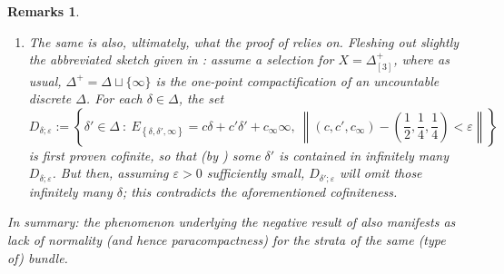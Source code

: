 \documentclass[11pt,leqno]{article}
\theoremstyle{plain}
\theoremstyle{plain}
\theoremstyle{plain}
\newtheorem{remarks}[lemma]{Remarks}
\numberwithin{equation}{section}
\theoremstyle{nonumberplain}
\newcommand\1{{\bf 1}}
\begin{document}
\begin{remarks}
\begin{enumerate}[(1),wide]
  \item The same  is also, ultimately, what the proof of \cite[Proposition]{zbMATH03569401} relies on. Fleshing out slightly the abbreviated sketch given in \cite[Theorem 5.2]{rs_cont-sel}: assume a selection  for $X=\Delta^+_{[3]}$, where as usual, $\Delta^+=\Delta\sqcup\{\infty\}$ is the one-point compactification of an uncountable discrete $\Delta$. For each $\delta\in \Delta$, the set
    \begin{equation*}
      D_{\delta;\varepsilon}
      :=
      \left\{
        \delta'\in \Delta
        \ :\
        E_{\left\{\delta,\delta',\infty\right\}}
        =
        c\delta+c'\delta'+c_{\infty}\infty
        ,\
        \left\|(c,c',c_{\infty})-\left(\frac 12,\frac 14,\frac 14\right)<\varepsilon\right\|
      \right\}
    \end{equation*}
    is first proven cofinite, so that (by ) some $\delta'$ is contained in infinitely many $D_{\delta;\varepsilon}$. But then, assuming $\varepsilon>0$ sufficiently small, $D_{\delta';\varepsilon}$ will omit those infinitely many $\delta$; this contradicts the aforementioned cofiniteness. 
  \end{enumerate}
  In summary: the phenomenon underlying the negative result of \Cref{th:pt.non.metr} also manifests as lack of normality (and hence paracompactness) for the strata of the same (type of) bundle. 
\end{remarks}
\end{document}

